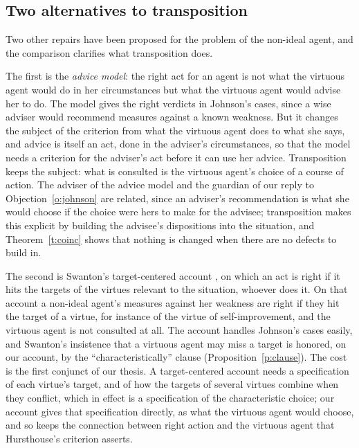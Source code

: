 \documentclass{situationist-preprint}
\begin{document}
\subsection{Two alternatives to transposition}

Two other repairs have been proposed for the problem of the non-ideal agent, and the comparison clarifies what transposition does.

The first is the \emph{advice model}: the right act for an agent is not what the virtuous agent would do in her circumstances but what the virtuous agent would advise her to do. The model gives the right verdicts in Johnson's cases, since a wise adviser would recommend measures against a known weakness. But it changes the subject of the criterion from what the virtuous agent does to what she says, and advice is itself an act, done in the adviser's circumstances, so that the model needs a criterion for the adviser's act before it can use her advice. Transposition keeps the subject: what is consulted is the virtuous agent's choice of a course of action. The adviser of the advice model and the guardian of our reply to Objection~\ref{o:johnson} are related, since an adviser's recommendation is what she would choose if the choice were hers to make for the advisee; transposition makes this explicit by building the advisee's dispositions into the situation, and Theorem~\ref{t:coinc} shows that nothing is changed when there are no defects to build in.

The second is Swanton's target-centered account \citep{Swanton2001}, on which an act is right if it hits the targets of the virtues relevant to the situation, whoever does it. On that account a non-ideal agent's measures against her weakness are right if they hit the target of a virtue, for instance of the virtue of self-improvement, and the virtuous agent is not consulted at all. The account handles Johnson's cases easily, and Swanton's insistence that a virtuous agent may miss a target is honored, on our account, by the \enquote{characteristically} clause (Proposition~\ref{p:clause}). The cost is the first conjunct of our thesis. A target-centered account needs a specification of each virtue's target, and of how the targets of several virtues combine when they conflict, which in effect is a specification of the characteristic choice; our account gives that specification directly, as what the virtuous agent would choose, and so keeps the connection between right action and the virtuous agent that Hursthouse's criterion asserts.
\end{document}
